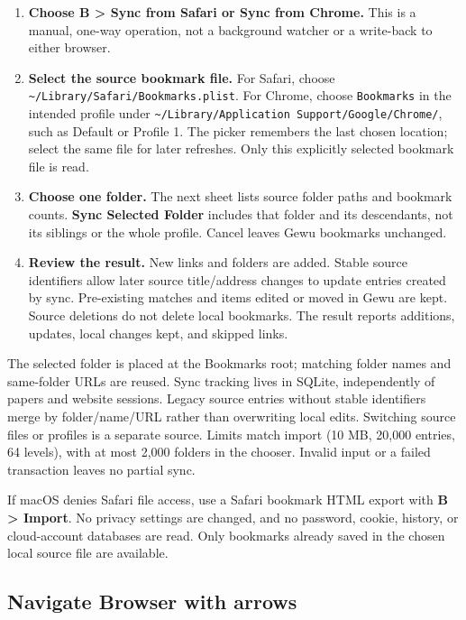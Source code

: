 \documentclass[10pt,letterpaper,oneside]{scrreprt}
\providecommand{\tightlist}{\setlength{\itemsep}{1pt}\setlength{\parskip}{0pt}}
\begin{document}
\begin{enumerate}
\tightlist
\item
  \textbf{Choose \textbf{B \textgreater{} Sync from Safari} or \textbf{Sync from Chrome}.} This is a manual, one-way operation, not a background watcher or a write-back to either browser.
\item
  \textbf{Select the source bookmark file.} For Safari, choose \texttt{\textasciitilde{}/Library/Safari/Bookmarks.plist}. For Chrome, choose \texttt{Bookmarks} in the intended profile under \texttt{\textasciitilde{}/Library/Application\ Support/Google/Chrome/}, such as Default or Profile 1. The picker remembers the last chosen location; select the same file for later refreshes. Only this explicitly selected bookmark file is read.
\item
  \textbf{Choose one folder.} The next sheet lists source folder paths and bookmark counts. \textbf{Sync Selected Folder} includes that folder and its descendants, not its siblings or the whole profile. Cancel leaves Gewu bookmarks unchanged.
\item
  \textbf{Review the result.} New links and folders are added. Stable source identifiers allow later source title/address changes to update entries created by sync. Pre-existing matches and items edited or moved in Gewu are kept. Source deletions do not delete local bookmarks. The result reports additions, updates, local changes kept, and skipped links.
\end{enumerate}

The selected folder is placed at the Bookmarks root; matching folder names and same-folder URLs are reused. Sync tracking lives in SQLite, independently of papers and website sessions. Legacy source entries without stable identifiers merge by folder/name/URL rather than overwriting local edits. Switching source files or profiles is a separate source. Limits match import (10 MB, 20,000 entries, 64 levels), with at most 2,000 folders in the chooser. Invalid input or a failed transaction leaves no partial sync.

If macOS denies Safari file access, use a Safari bookmark HTML export with \textbf{B \textgreater{} Import}. No privacy settings are changed, and no password, cookie, history, or cloud-account databases are read. Only bookmarks already saved in the chosen local source file are available.

\subsection{Navigate Browser with arrows}\label{navigate-browser-with-arrows}
\end{document}
